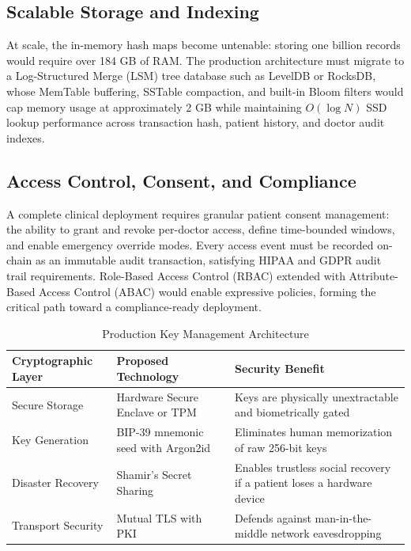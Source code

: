 \documentclass[12pt]{article}
\begin{document}
\subsection{Scalable Storage and Indexing}

At scale, the in-memory hash maps become untenable: storing one billion records would require over 184 GB of RAM. The production architecture must migrate to a Log-Structured Merge (LSM) tree database such as LevelDB or RocksDB, whose MemTable buffering, SSTable compaction, and built-in Bloom filters would cap memory usage at approximately 2 GB while maintaining $O(\log N)$ SSD lookup performance across transaction hash, patient history, and doctor audit indexes.

\subsection{Access Control, Consent, and Compliance}

A complete clinical deployment requires granular patient consent management: the ability to grant and revoke per-doctor access, define time-bounded windows, and enable emergency override modes. Every access event must be recorded on-chain as an immutable audit transaction, satisfying HIPAA and GDPR audit trail requirements. Role-Based Access Control (RBAC) extended with Attribute-Based Access Control (ABAC) would enable expressive policies, forming the critical path toward a compliance-ready deployment.


\begin{table}[htbp]
\centering
\small
\renewcommand{\arraystretch}{1.15}
\caption{Production Key Management Architecture}
\label{tab:key-management}
\vspace{2mm}
\begin{tabularx}{\textwidth}{|Y|Y|Y|}
\hline
\textbf{Cryptographic Layer} & \textbf{Proposed Technology} & \textbf{Security Benefit} \\ \hline
Secure Storage & Hardware Secure Enclave or TPM & Keys are physically unextractable and biometrically gated \\ \hline
Key Generation & BIP-39 mnemonic seed with Argon2id & Eliminates human memorization of raw 256-bit keys \\ \hline
Disaster Recovery & Shamir's Secret Sharing & Enables trustless social recovery if a patient loses a hardware device \\ \hline
Transport Security & Mutual TLS with PKI & Defends against man-in-the-middle network eavesdropping \\ \hline
\end{tabularx}
\end{table}
\end{document}

